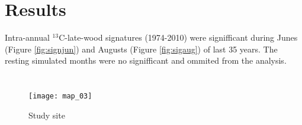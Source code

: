 \documentclass[review,authoryear]{elsarticle}
\begin{document}
\section{Results}


Intra-annual $^{13}$C-late-wood signatures (1974-2010) were
signifficant during Junes (Figure \ref{fig:signjun}) and Augusts
(Figure \ref{fig:sigaug}) of last 35 years. The resting simulated
months were no signifficant and ommited from the analysis.

\newpage
\section{\refname}



\clearpage
\begin{figure}\centering
\texttt{[image: map\_03]} 
\caption{Study site}
\label{fig:map_03} 
\end{figure}
\end{document}
